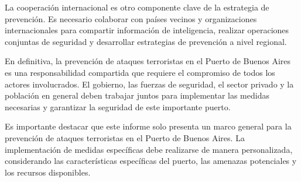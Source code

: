 \documentclass{article}
\begin{document}
La cooperación internacional es otro componente clave de la estrategia
de prevención. Es necesario colaborar con países vecinos y
organizaciones internacionales para compartir información de
inteligencia, realizar operaciones conjuntas de seguridad y desarrollar
estrategias de prevención a nivel regional.

En definitiva, la prevención de ataques terroristas en el Puerto de
Buenos Aires es una responsabilidad compartida que requiere el
compromiso de todos los actores involucrados. El gobierno, las fuerzas
de seguridad, el sector privado y la población en general deben trabajar
juntos para implementar las medidas necesarias y garantizar la seguridad
de este importante puerto.

Es importante destacar que este informe solo presenta un marco general
para la prevención de ataques terroristas en el Puerto de Buenos Aires.
La implementación de medidas específicas debe realizarse de manera
personalizada, considerando las características específicas del puerto,
las amenazas potenciales y los recursos disponibles.



\end{document}
